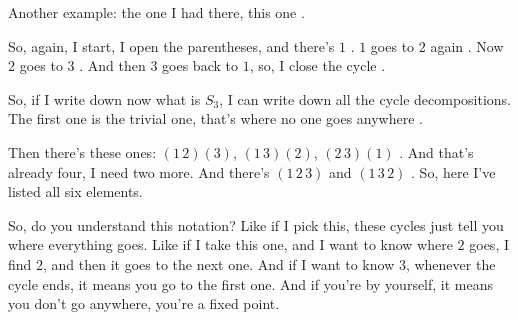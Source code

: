 \begin{content}

\end{content}

\begin{speech}[01:08:35 - 01:10:01]
Another example: the one I had there, this one .

So, again, I start, I open the parentheses, and there's $1$ . $1$ goes to $2$ again . Now $2$ goes to $3$ . And then $3$ goes back to $1$, so, I close the cycle .

So, if I write down now what is $S_3$, I can write down all the cycle decompositions. The first one is the trivial one, that's where no one goes anywhere .

Then there's these ones: $(1\,2)(3)$, $(1\,3)(2)$, $(2\,3)(1)$ . And that's already four, I need two more. And there's $(1\,2\,3)$ and $(1\,3\,2)$ . So, here I've listed all six elements.

So, do you understand this notation? Like if I pick this, these cycles just tell you where everything goes. Like if I take this one, and I want to know where $2$ goes, I find $2$, and then it goes to the next one. And if I want to know $3$, whenever the cycle ends, it means you go to the first one. And if you're by yourself, it means you don't go anywhere, you're a fixed point.
\end{speech}

